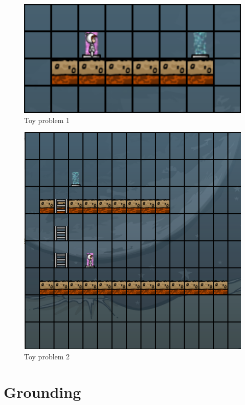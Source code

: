 \begin{figure}
	\centering
	\caption{Toy problem 1}
	\label{prob01}
	
	\includegraphics[width=1.0\textwidth]{appendix/img/prob01}
\end{figure}
\begin{figure}
	\centering
	\caption{Toy problem 2}
	\label{prob02}
	
	\includegraphics[width=1.0\textwidth]{appendix/img/prob02}
\end{figure}
\section{Grounding}
\label{grounding}

